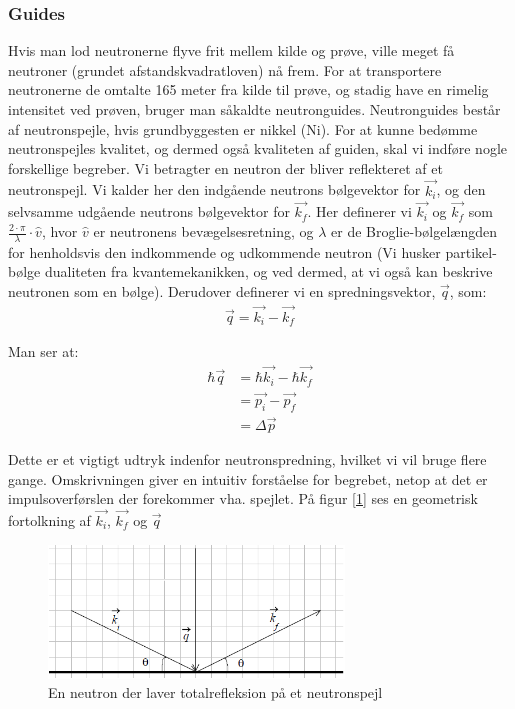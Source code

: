 \documentclass[12pt,oneside,a4paper]{article}
\begin{document}
{{{{{\subsubsection{Guides}

Hvis man lod neutronerne flyve frit mellem kilde og prøve, ville meget få neutroner (grundet afstandskvadratloven) nå frem. For at transportere neutronerne de omtalte 165 meter fra kilde til prøve, og stadig have en rimelig intensitet ved prøven, bruger man såkaldte neutronguides. Neutronguides består af neutronspejle, hvis grundbyggesten er nikkel (Ni).
For at kunne bedømme neutronspejles kvalitet, og dermed også kvaliteten af guiden, skal vi indføre nogle forskellige begreber. Vi betragter en neutron der bliver reflekteret af et neutronspejl. Vi kalder her den indgående neutrons bølgevektor for $\vec{k_i}$, og den selvsamme udgående neutrons bølgevektor for  $\vec{k_f}$. Her definerer vi $\vec{k_i}$ og $\vec{k_f}$ som  $ {\frac{2 \cdot \pi}{\lambda}} \cdot \hat{v}$, hvor $\hat{v}$ er neutronens bevægelsesretning, og $\lambda$ er de Broglie-bølgelængden for henholdsvis den indkommende og udkommende neutron (Vi husker partikel-bølge dualiteten fra kvantemekanikken, og ved dermed, at vi også kan beskrive neutronen som en bølge). Derudover definerer vi en spredningsvektor, $\vec{q}$, som:
\begin{align}
\vec{q}=\vec{k_i}-\vec{k_f}
\end{align}

Man ser at:
\begin{align}
\hbar \vec{q} & = \hbar \vec{k_i} - \hbar \vec{k_f} \\ 
          & = \vec{p_i} - \vec{p_f} \\ 
          & = \Delta \vec{p}
\end{align}

Dette er et vigtigt udtryk indenfor neutronspredning, hvilket vi vil bruge flere gange. Omskrivningen giver en intuitiv forståelse for begrebet, netop at det er impulsoverførslen der forekommer vha. spejlet. På figur [\ref{neutronspejl}] ses en geometrisk fortolkning af $\vec{k_i}$, $\vec{k_f}$  og $ \vec{q}$

\begin{figure}[H]
\centering
\includegraphics[width=0.7\textwidth]{billederjaer.png}
\caption{En neutron der laver totalrefleksion på et neutronspejl} \label{neutronspejl}
\end{figure}

}}}}}
\end{document}
